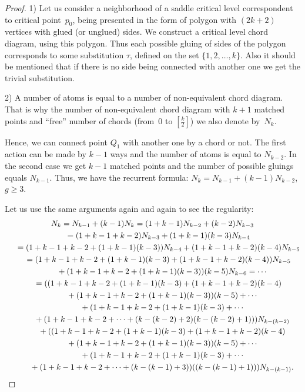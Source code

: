 \documentclass[10pt,a4paper]{amsart}
\numberwithin{equation}{section}
\begin{document}
\begin{proof}
1) Let us consider a neighborhood of a saddle critical level correspondent to critical point~$p_{0}$, being presented in the form of polygon with $(2k+2)$ vertices with glued (or unglued) sides. We construct a critical level chord diagram, using this polygon. Thus each possible gluing of sides of the polygon corresponds to some substitution $\tau$, def\/ined on the set $\{1,2,\dots,k\}$. Also it should be mentioned that if there is no side being connected with another one we get the trivial substitution.

2) A number of atoms is equal to a number of non-equivalent chord diagram. That is why the number of non-equivalent chord diagram with $k+1$ matched points and ``free'' number of chords (from~$0$ to $[\frac{k}{2}]$) we also denote by~$N_{k}$.

Hence, we can connect point $Q_1$ with another one by a chord or not. The f\/irst action can be made by $k-1$ ways and the number of atoms is equal to $N_{k-2}$. In the second case we get $k-1$ matched points and the number of possible gluings equals $N_{k-1}$. Thus, we have the recurrent formula: $N_{k}=N_{k-1}+(k-1) N_{k-2}$, $g\geq3$.

Let us use the same arguments again and again to see the regularity:
\begin{gather*}
N_{k} = N_{k-1}+(k-1) N_{k} = (1+k-1) N_{k-2}+(k-2) N_{k-3} \\
\hphantom{N_{k}}{} = (1+k-1+k-2) N_{k-3}+(1+k-1)(k-3) N_{k-4}\\
\hphantom{N_{k}}{} =(1+k-1+k-2+(1+k-1)(k-3)) N_{k-4}+(1+k-1+k-2)(k-4)N_{k-5} \\
\hphantom{N_{k}}{} = (1+k-1+k-2+(1+k-1)(k-3)+(1+k-1+k-2)(k-4)) N_{k-5}\\
\hphantom{N_{k}=}{}
+(1+k-1+k-2+(1+k-1)(k-3))(k-5) N_{k-6} = \cdots \\
\hphantom{N_{k}}{} = ((1+k-1+k-2+(1+k-1)(k-3)+(1+k-1+k-2)(k-4)\\
\hphantom{N_{k}=}{}
+(1+k-1+k-2+(1+k-1)(k-3))(k-5)+\cdots\\
\hphantom{N_{k}=}{} +(1+k-1+k-2+(1+k-1)(k-3)+\cdots\\
\hphantom{N_{k}=}{}
+(1+k-1+k-2+\cdots+ (k-(k-2)+2)(k-(k-2)+1))) N_{k-(k-2)}\\
\hphantom{N_{k}=}{}
 + ((1+k-1+k-2+(1+k-1)(k-3)+(1+k-1+k-2)(k-4)\\
\hphantom{N_{k}=}{}
+(1+k-1+k-2+(1+k-1)(k-3))(k-5)+\cdots \\
\hphantom{N_{k}=}{}
+(1+k-1+k-2+(1+k-1)(k-3)+\cdots\\
\hphantom{N_{k}=}{}
+(1+k-1+k-2+\cdots+ (k-(k-1)+3))((k-(k-1)+1))) N_{k-(k-1)}.
\end{gather*}


\end{proof}
\end{document}
